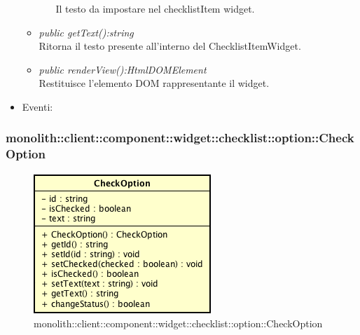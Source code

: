 \begin{itemize}
\begin{itemize}
\begin{itemize}
		Il testo da impostare nel checklistItem widget.
		\end{itemize}
	\item \textit{public getText():string}\\
	Ritorna il testo presente all'interno del ChecklistItemWidget.
	\item \textit{public renderView():HtmlDOMElement}\\
	Restituisce l'elemento DOM rappresentante il widget.
	\end{itemize}
\item{Eventi}:
\end{itemize}

\subsubsection{monolith::client::component::widget::checklist::option::CheckOption}

\label{monolith::client::component::widget::checklist::option::CheckOption}
\begin{figure}[H]
	\centering
	\includegraphics[scale=0.5]{Sezioni/SottosezioniST/img/CheckOption.png}
	\caption{monolith::client::component::widget::checklist::option::CheckOption}
\end{figure}

